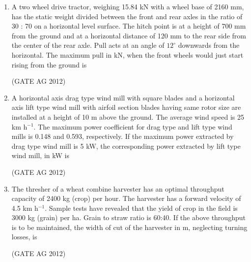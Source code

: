 \documentclass[journal]{IEEEtran}
\begin{document}
\begin{enumerate}
\medskip

\item
 A two wheel drive tractor, weighing 15.84 kN with a wheel base of 2160 mm, has the static weight divided between the front and rear axles in the ratio of 30 : 70 on a horizontal level surface. The hitch point is at a height of 700 mm from the ground and at a horizontal distance of 120 mm to the rear side from the center of the rear axle. Pull acts at an angle of $12^\circ$ downwards from the horizontal. The maximum pull in kN, when the front wheels would just start rising from the ground is
\begin{enumerate}
\end{enumerate}
\hfill(GATE AG 2012)\\

\medskip

\item
 A horizontal axis drag type wind mill with square blades and a horizontal axis lift type wind mill with airfoil section blades having same rotor size are installed at a height of 10 m above the ground. The average wind speed is 25 km h$^{-1}$. The maximum power coefficient for drag type and lift type wind mills is 0.148 and 0.593, respectively. If the maximum power extracted by drag type wind mill is 5 kW, the corresponding power extracted by lift type wind mill, in kW is
\begin{enumerate}
\end{enumerate}
\hfill(GATE AG 2012)\\

\medskip

\item
 The thresher of a wheat combine harvester has an optimal throughput capacity of 2400 kg (crop) per hour. The harvester has a forward velocity of 4.5 km h$^{-1}$. Sample tests have revealed that the yield of crop in the field is 3000 kg (grain) per ha. Grain to straw ratio is 60:40. If the above throughput is to be maintained, the width of cut of the harvester in m, neglecting turning losses, is
\begin{enumerate}
\end{enumerate}
\hfill(GATE AG 2012)\\


\end{enumerate}
\end{document}
